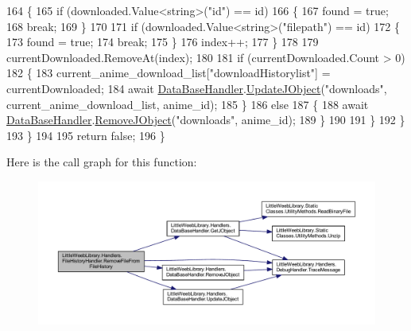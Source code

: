 \begin{DoxyCode}
164                         \{
165                             \textcolor{keywordflow}{if} (downloaded.Value<\textcolor{keywordtype}{string}>(\textcolor{stringliteral}{"id"}) == id)
166                             \{
167                                 found = \textcolor{keyword}{true};
168                                 \textcolor{keywordflow}{break};
169                             \}
170 
171                             \textcolor{keywordflow}{if} (downloaded.Value<\textcolor{keywordtype}{string}>(\textcolor{stringliteral}{"filepath"}) == id)
172                             \{
173                                 found = \textcolor{keyword}{true};
174                                 \textcolor{keywordflow}{break};
175                             \}
176                             index++;
177                         \}
178 
179                         currentDownloaded.RemoveAt(index);
180 
181                         \textcolor{keywordflow}{if} (currentDownloaded.Count > 0)
182                         \{
183                             current\_anime\_download\_list[\textcolor{stringliteral}{"downloadHistorylist"}] = currentDownloaded;
184                             await \mbox{\hyperlink{class_little_weeb_library_1_1_handlers_1_1_file_history_handler_afe186c8ea770ecb9253a07f82f23c471}{DataBaseHandler}}.\mbox{\hyperlink{interface_little_weeb_library_1_1_handlers_1_1_i_data_base_handler_a00c429576be33aa60bdf1a88edaf88c6}{UpdateJObject}}(\textcolor{stringliteral}{"downloads"}, 
      current\_anime\_download\_list, anime\_id);
185                         \}
186                         \textcolor{keywordflow}{else}
187                         \{
188                             await \mbox{\hyperlink{class_little_weeb_library_1_1_handlers_1_1_file_history_handler_afe186c8ea770ecb9253a07f82f23c471}{DataBaseHandler}}.\mbox{\hyperlink{interface_little_weeb_library_1_1_handlers_1_1_i_data_base_handler_a76b8da1f75749b16e095dc3d635cebdf}{RemoveJObject}}(\textcolor{stringliteral}{"downloads"}, 
      anime\_id);
189                         \}
190 
191                     \}
192                 \}
193             \}
194 
195             \textcolor{keywordflow}{return} \textcolor{keyword}{false};
196         \}
\end{DoxyCode}
Here is the call graph for this function\+:\nopagebreak
\begin{figure}[H]
\begin{center}
\leavevmode
\includegraphics[width=350pt]{class_little_weeb_library_1_1_handlers_1_1_file_history_handler_a3b3f0cdedee405d607feff81c2de085d_cgraph}
\end{center}
\end{figure}
